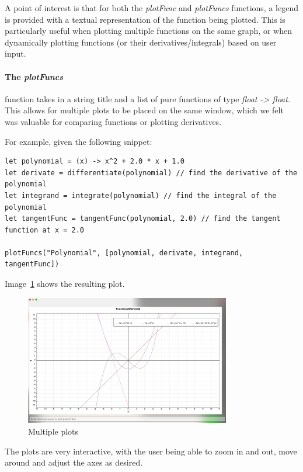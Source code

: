 A point of interest is that for both the \textit{plotFunc} and \textit{plotFuncs} functions, a legend is provided 
with a textual representation of the function being plotted.
This is particularly useful when plotting multiple functions on the same graph, or when dynamically plotting 
functions (or their derivatives/integrals) based on user input.

\paragraph{The \textit{plotFuncs}} function takes in a string title and a list of pure functions of type 
\textit{float -> float}.
This allows for multiple plots to be placed on the same window, which we felt was valuable for comparing functions 
or plotting derivatives.

For example, given the following snippet:

\begin{verbatim}
let polynomial = (x) -> x^2 + 2.0 * x + 1.0
let derivate = differentiate(polynomial) // find the derivative of the polynomial
let integrand = integrate(polynomial) // find the integral of the polynomial
let tangentFunc = tangentFunc(polynomial, 2.0) // find the tangent function at x = 2.0

plotFuncs("Polynomial", [polynomial, derivate, integrand, tangentFunc])
\end{verbatim}

Image~\ref{fig:multiple-plots} shows the resulting plot.

\begin{figure}[H]
    \centering
    \includegraphics[width=0.8\textwidth]{assets/multiplePlots}
    \caption{Multiple plots}\label{fig:multiple-plots}
\end{figure}

The plots are very interactive, with the user being able to zoom in and out, move around and adjust the axes as
desired.

